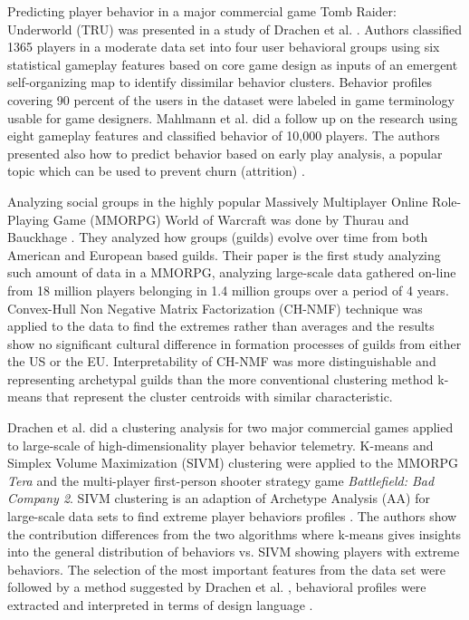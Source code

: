 Predicting player behavior in a major commercial game Tomb Raider: Underworld (TRU) was presented in a study of Drachen et al. \citep{Drachen:2009Tomb}. Authors classified 1365 players in a moderate data set into four user behavioral groups using six statistical gameplay features based on core game design as inputs of an emergent self-organizing map to identify dissimilar behavior clusters. Behavior profiles covering 90 percent of the users in the dataset were labeled in game terminology usable for game designers. Mahlmann et al. \citep{Mahlmann:2010Tomb} did a follow up on the research using eight gameplay features and classified behavior of 10,000 players. The authors presented also how to predict behavior based on early play analysis, a popular topic which can be used to prevent churn (attrition) \citep{Fields:2011SocialGame}.

Analyzing social groups in the highly popular Massively Multiplayer Online Role-Playing Game (MMORPG) World of Warcraft was done by Thurau and Bauckhage \citep{Thurau:2010WoW}. They analyzed how groups (guilds) evolve over time from both American and European based guilds. Their paper is the first study analyzing such amount of data in a MMORPG, analyzing large-scale data gathered on-line from 18 million players belonging in 1.4 million groups over a period of 4 years. Convex-Hull Non Negative Matrix Factorization (CH-NMF) \citep{Thurau:2009SVIM} technique was applied to the data to find the extremes rather than averages and the results show  no significant cultural difference in formation processes of guilds from either the US or the EU. Interpretability of CH-NMF was more distinguishable and representing archetypal guilds than the more conventional clustering method k-means that represent the cluster centroids with similar characteristic.

Drachen et al. \citep{Drachen:2012} did a clustering analysis for two major commercial games applied to large-scale of high-dimensionality player behavior telemetry. K-means and Simplex Volume Maximization (SIVM) clustering were applied to the MMORPG \textit{Tera} and the multi-player first-person shooter strategy game \textit{Battlefield: Bad Company 2}. SIVM clustering is an adaption of Archetype Analysis (AA) for large-scale data sets to find extreme player behaviors profiles \citep{Thurau:2009SVIM, Kersting:2010SVIM}. The authors show the contribution differences from the two algorithms where k-means gives insights into the general distribution of behaviors vs. SIVM showing players with extreme behaviors. The selection of the most important features from the data set were followed by a method suggested by Drachen et al. \citep{Drachen:2009Tomb}, behavioral profiles were extracted and interpreted in terms of design language \citep{Drachen:2009Tomb, Zoeller:2010}.

